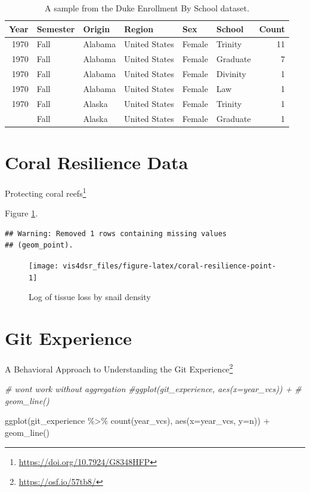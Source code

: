 \documentclass[
]{krantz}
\makeatletter
\newenvironment{Shaded}{\begin{snugshade}}{\end{snugshade}}
\newcommand{\AttributeTok}[1]{\textcolor[rgb]{0.61,0.61,0.61}{#1}}
\newcommand{\CommentTok}[1]{\textcolor[rgb]{0.37,0.37,0.37}{\textit{#1}}}
\newcommand{\FunctionTok}[1]{\textcolor[rgb]{0,0,0}{#1}}
\newcommand{\NormalTok}[1]{#1}
\newcommand{\SpecialCharTok}[1]{\textcolor[rgb]{0,0,0}{#1}}
\renewcommand{\href}[2]{#2\footnote{\url{#1}}}
\newenvironment{kframe}{%
\medskip{}
\setlength{\fboxsep}{.8em}
 \def\at@end@of@kframe{}%
 \ifinner\ifhmode%
  \def\at@end@of@kframe{\end{minipage}}%
  \begin{minipage}{\columnwidth}%
 \fi\fi%
 \def\FrameCommand##1{\hskip\@totalleftmargin \hskip-\fboxsep
 \colorbox{shadecolor}{##1}\hskip-\fboxsep
     \hskip-\linewidth \hskip-\@totalleftmargin \hskip\columnwidth}%
 \MakeFramed {\advance\hsize-\width
   \@totalleftmargin\z@ \linewidth\hsize
   \@setminipage}}%
 {\par\unskip\endMakeFramed%
 \at@end@of@kframe}
\renewenvironment{Shaded}{\begin{kframe}}{\end{kframe}}
\makeatother
\begin{document}
\begin{table}

\caption{\label{tab:duke-school-tab}A sample from the Duke Enrollment By School dataset.}
\centering
\begin{tabular}[t]{rlllllr}
\toprule
Year & Semester & Origin & Region & Sex & School & Count\\
\midrule
1970 & Fall & Alabama & United States & Female & Trinity & 11\\
1970 & Fall & Alabama & United States & Female & Graduate & 7\\
1970 & Fall & Alabama & United States & Female & Divinity & 1\\
1970 & Fall & Alabama & United States & Female & Law & 1\\
1970 & Fall & Alaska & United States & Female & Trinity & 1\\
\addlinespace
1970 & Fall & Alaska & United States & Female & Graduate & 1\\
\bottomrule
\end{tabular}
\end{table}

\hypertarget{coral-resilience-data}{%
\section*{Coral Resilience Data}\label{coral-resilience-data}}


\href{https://doi.org/10.7924/G8348HFP}{Protecting coral reefs}

Figure \ref{fig:coral-resilience-point}.

\begin{verbatim}
## Warning: Removed 1 rows containing missing values
## (geom_point).
\end{verbatim}

\begin{figure}
\texttt{[image: vis4dsr\_files/figure-latex/coral-resilience-point-1]} \caption{Log of tissue loss by snail density}\label{fig:coral-resilience-point}
\end{figure}

\hypertarget{git-experience}{%
\section*{Git Experience}\label{git-experience}}


\href{https://osf.io/57tb8/}{A Behavioral Approach to Understanding the Git Experience}

\begin{Shaded}
\begin{Highlighting}[]
\CommentTok{\# won\textquotesingle{}t work without aggregation}
\CommentTok{\#ggplot(git\_experience, aes(x=year\_vcs)) +}
\CommentTok{\#  geom\_line()}

\FunctionTok{ggplot}\NormalTok{(git\_experience }\SpecialCharTok{\%\textgreater{}\%} \FunctionTok{count}\NormalTok{(year\_vcs), }\FunctionTok{aes}\NormalTok{(}\AttributeTok{x=}\NormalTok{year\_vcs, }\AttributeTok{y=}\NormalTok{n)) }\SpecialCharTok{+}
  \FunctionTok{geom\_line}\NormalTok{()}
\end{Highlighting}
\end{Shaded}
\end{document}

